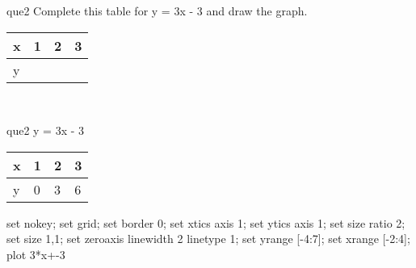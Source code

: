 \documentclass[13.5pt, varwidth=true]{beamer}
\begin{document}
\begin{frame}[shrink=19,fragile]
	\begin{beamercolorbox}[rounded=true, left, shadow=true,wd=14.8cm]{que2}
		 Complete this table for y = 3x - 3 and draw the graph. \\[0.3cm] \renewcommand{\arraystretch}{1.2}\begin{tabular}{|C|C|C|C|} \hline x & 1 & 2 & 3 \\ \hline y & & & \\ \hline \end{tabular}\\[0.3cm]
	\end{beamercolorbox}
\end{frame}
\begin{frame}[shrink=19,fragile]
	\begin{beamercolorbox}[rounded=true, left, shadow=true,wd=14.8cm]{que2}
		y = 3x - 3\renewcommand{\arraystretch}{1.2}\begin{tabular}{|C|C|C|C|} \hline x & 1 & 2 & 3 \\ \hline y & 0 & 3 & 6\\ \hline \end{tabular}\begin{gnuplot}[terminal=pdf] set nokey; set grid; set border 0; set xtics axis 1; set ytics axis 1; set size ratio 2; set size 1,1; set zeroaxis linewidth 2 linetype 1; set yrange [-4:7]; set xrange [-2:4]; plot 3*x+-3 \end{gnuplot}
	\end{beamercolorbox}
\end{frame}
\end{document}

